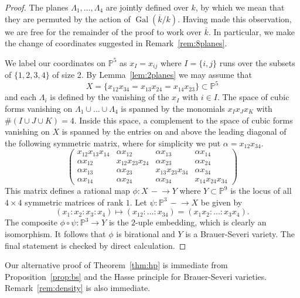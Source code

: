 \documentclass[12pt]{amsart}
\newcommand{\Gal}{{\operatorname{Gal}}}
\newcommand{\PP}{{\mathbb P}}
\newcommand{\kbar}{{\overline k}}
\theoremstyle{definition}
\begin{document}
\begin{proof}
  The planes $\Lambda_1, \ldots, \Lambda_4$ are jointly defined over
  $k$, by which we mean that they are permuted by the action of
  $\Gal(\kbar/k)$. Having made this observation, we are free for the
  remainder of the proof to work over $\kbar$.  In particular, we make
  the change of coordinates suggested in Remark~\ref{rem:8planes}.

  We label our coordinates on $\PP^5$ as $x_I = x_{ij}$ where
  $I = \{i,j\}$ runs over the subsets of $\{1,2,3,4\}$ of size 2. By
  Lemma~\ref{lem:2planes} we may assume that
  \[ X = \{ x_{12}x_{34} = x_{13}x_{24} = x_{14}x_{23} \} \subset
    \PP^5 \] and each $\Lambda_i$ is defined by the vanishing of the
  $x_I$ with $i \in I$.  The space of cubic forms vanishing on
  $\Lambda_1 \cup \ldots \cup \Lambda_4$ is spanned by the monomials
  $x_I x_J x_K$ with $\#(I \cup J \cup K) = 4$.  Inside this space, a
  complement to the space of cubic forms vanishing on $X$ is spanned
  by the entries on and above the leading diagonal of the following
  symmetric matrix, where for simplicity we put
  $\alpha = x_{12} x_{34}$.
 \[ \begin{pmatrix}
    x_{12}x_{13}x_{14} & \alpha x_{12} & \alpha x_{13} & \alpha x_{14} \\
    \alpha x_{12} & x_{12}x_{23}x_{24} & \alpha x_{23} & \alpha x_{24} \\
    \alpha x_{13} & \alpha x_{23} & x_{13}x_{23}x_{34} &  \alpha x_{34} \\
    \alpha x_{14} & \alpha x_{24} & \alpha x_{34} & x_{14}x_{24}x_{34}
  \end{pmatrix} \]
  This matrix defines a rational map $\phi : X \, - \!  \to Y$ where
  $Y \subset \PP^9$ is the locus of all $4 \times 4$ symmetric matrices
  of rank $1$.  Let $\psi : \PP^3 \, - \!  \to X$ be given by
 \begin{equation}
 \label{ratparam}
   (x_1: x_2:x_3:x_4) \mapsto (x_{12} : \ldots : x_{34})
   = (x_1x_2 : \ldots : x_3 x_4).
 \end{equation}
 The composite $\phi \circ \psi : \PP^3 \to Y$ is the $2$-uple
 embedding, which is clearly an isomorphism. It follows that $\phi$ is
 birational and $Y$ is a Brauer-Severi variety. The final statement is
 checked by direct calculation.
\end{proof}

Our alternative proof of Theorem~\ref{thm:hp} is immediate from
Proposition~\ref{prop:bs} and the Hasse principle for Brauer-Severi
varieties. Remark~\ref{rem:density} is also immediate.
\end{document}
